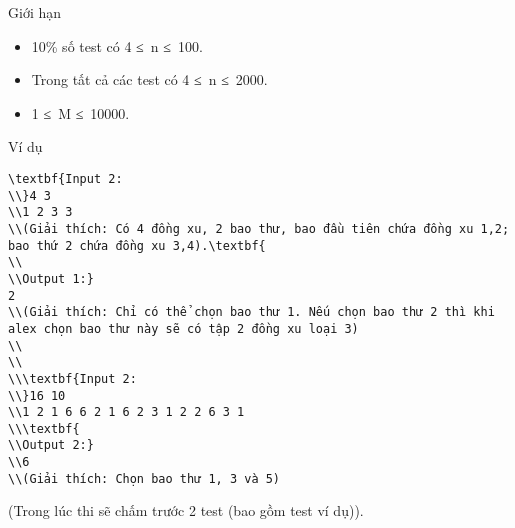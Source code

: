 Giới hạn  
\begin{itemize}
	\item     10\% số test có 4 ≤ n ≤ 100.   
	\item     Trong tất cả các test có 4 ≤ n ≤ 2000.   
	\item     1 ≤ M ≤ 10000.   
\end{itemize}
\begin{itemize}
\end{itemize}
   Ví dụ  
\begin{verbatim}
\textbf{Input 2:
\\}4 3
\\1 2 3 3
\\(Giải thích: Có 4 đồng xu, 2 bao thư, bao đầu tiên chứa đồng xu 1,2; bao thứ 2 chứa đồng xu 3,4).\textbf{
\\
\\Output 1:}
2
\\(Giải thích: Chỉ có thể chọn bao thư 1. Nếu chọn bao thư 2 thì khi alex chọn bao thư này sẽ có tập 2 đồng xu loại 3)
\\
\\
\\\textbf{Input 2:
\\}16 10
\\1 2 1 6 6 2 1 6 2 3 1 2 2 6 3 1
\\\textbf{
\\Output 2:}
\\6
\\(Giải thích: Chọn bao thư 1, 3 và 5)\end{verbatim}

(Trong lúc thi sẽ chấm trước 2 test (bao gồm test ví dụ)).
